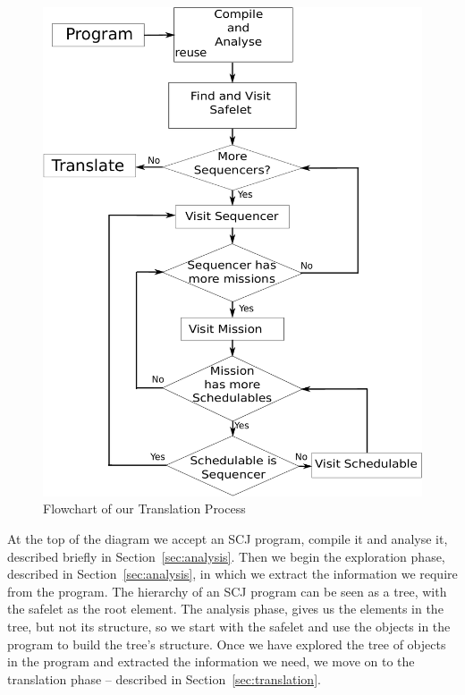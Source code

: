 \documentclass[10pt,a4paper]{article}
\begin{document}
\begin{figure}[h!]
\begin{center}
\includegraphics[scale=0.5]{translation.pdf}
\caption{Flowchart of our Translation Process \label{fig:translationFlow} }
\end{center}
\end{figure}

At the top of the diagram we accept an SCJ program, compile it and analyse it, described briefly in Section~\ref{sec:analysis}. Then we begin the exploration phase, described in Section~\ref{sec:analysis}, in which we extract the information we require from the program. The hierarchy of an SCJ program can be seen as a tree, with the safelet as the root element. The analysis phase, gives us the elements in the tree, but not its structure, so we start with the safelet and use the objects in the program to build the tree's structure. Once we have explored the tree of objects in the program and extracted the information we need, we move on to the translation phase -- described in Section~\ref{sec:translation}.
\end{document}
